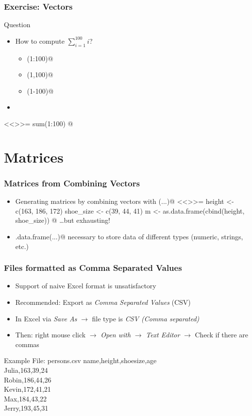 \documentclass[%
  final,
  11pt, 
  show notes, %
  t, %
  fleqn, %
]{beamer}
\begin{document}
\begin{frame}[fragile]
  \frametitle{Exercise: Vectors}
\vfill
\begin{exampleblock}{Question}
\begin{itemize}
\item How to compute $\sum\limits_{i=1}^{100}{i}$?
\begin{itemize}
\item \verb@sum(1:100)@
\item \verb@sum(1,100)@
\item \verb@sum(1-100)@
\end{itemize}
\item \CourseQuiz
\end{itemize}
\end{exampleblock}
\ifQuizSolution
\pause
<<>>=
sum(1:100)
@
\fi
\vfill
\end{frame}

\section{Matrices}

\begin{frame}[fragile]
  \frametitle{Matrices from Combining Vectors}
\vfill
\begin{itemize}
\item Generating matrices by combining vectors with \verb@cbind(...)@
<<>>=
height <- c(163, 186, 172)
shoe_size <- c(39, 44, 41)
m <- as.data.frame(cbind(height, shoe_size))
@
\ldots but exhausting!
\item \verb@as.data.frame(...)@ necessary to store data of different types (numeric, strings, etc.) 
\end{itemize}
\vfill
\end{frame}

\begin{frame}
  \frametitle{Files formatted as Comma Separated Values}
\vfill
\begin{itemize}
\item Support of naive Excel format is unsatisfactory
\item Recommended: Export as \emph{Comma Separated Values} (CSV)
\item In Excel via \emph{Save As} $\rightarrow$ file type is \emph{CSV (Comma separated)}
\item Then: right mouse click $\rightarrow$ \emph{Open with} $\rightarrow$ \emph{Text Editor} $\rightarrow$ Check if there are commas
\end{itemize}
\vspace*{0.3cm}
\begin{exampleblock}{Example File: persons.csv}
\ttfamily
name,height,shoesize,age\\
Julia,163,39,24\\
Robin,186,44,26\\
Kevin,172,41,21\\
Max,184,43,22\\
Jerry,193,45,31
\end{exampleblock}
\vfill
\end{frame}
\end{document}
